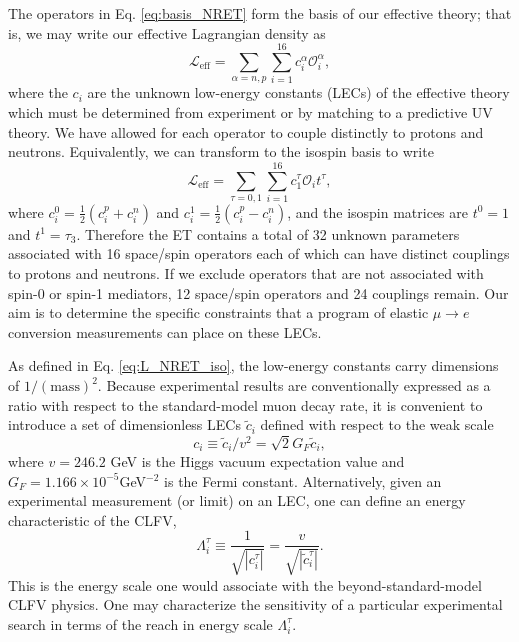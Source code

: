 \documentclass{book}[12pt]
\begin{document}
The operators in Eq. \ref{eq:basis_NRET} form the basis of our effective theory; that is, we may write our effective Lagrangian density as
\begin{equation}
\mathcal{L}_\mathrm{eff}=\sum_{\alpha=n,p}\sum_{i=1}^{16}c_i^{\alpha}\mathcal{O}_i^{\alpha},
\end{equation}
where the $c_i$ are the unknown low-energy constants (LECs) of the effective theory which must be determined from experiment or by matching to a predictive UV theory. We have allowed for each operator to couple distinctly to protons and neutrons. Equivalently, we can transform to the isospin basis to write
\begin{equation}
\mathcal{L}_\mathrm{eff}=\sum_{\tau=0,1}\sum_{i=1}^{16}c^{\tau}_1\mathcal{O}_it^{\tau},
\label{eq:L_NRET_iso}
\end{equation}
where $c^0_i=\frac{1}{2}\left(c_i^p+c_i^n\right)$ and $c_i^1=\frac{1}{2}\left(c_i^p-c_i^n\right)$, and the isospin matrices are $t^0=1$ and $t^1=\tau_3$. Therefore the ET contains a total of 32 unknown parameters associated with 16 space/spin operators each of which can have distinct couplings to protons and neutrons. If we exclude operators that are not associated with spin-0 or spin-1 mediators, 12 space/spin operators and 24 couplings remain. Our aim is to determine the specific constraints that a program of elastic $\mu\rightarrow e$ conversion measurements can place on these LECs.

As defined in Eq. \ref{eq:L_NRET_iso}, the low-energy constants carry dimensions of $1/(\mathrm{mass})^2$. Because experimental results are conventionally expressed as a ratio with respect to the standard-model muon decay rate, it is convenient to introduce a set of dimensionless LECs $\tilde{c}_i$ defined with respect to the weak scale
\begin{equation}
c_i\equiv \tilde{c}_i/v^2=\sqrt{2}G_F\tilde{c}_i,
\end{equation}
where $v=246.2$ GeV is the Higgs vacuum expectation value and $G_F=1.166\times 10^{-5}$GeV$^{-2}$ is the Fermi constant. Alternatively, given an experimental measurement (or limit) on an LEC, one can define an energy characteristic of the CLFV,
\begin{equation}
\Lambda_i^{\tau}\equiv\frac{1}{\sqrt{|c_i^{\tau}|}}=\frac{v}{\sqrt{|\tilde{c}_i^{\tau}|}}.
\end{equation}
This is the energy scale one would associate with the beyond-standard-model CLFV physics. One may characterize the sensitivity of a particular experimental search in terms of the reach in energy scale $\Lambda^\tau_i$.
\end{document}
